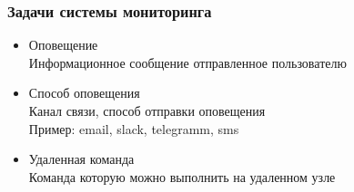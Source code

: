 \begin{frame}[fragile]
    \frametitle{Задачи системы мониторинга}
        \begin{itemize}
            \item \alert{Оповещение} \\
Информационное сообщение отправленное пользователю
            \item \alert{Способ оповещения} \\
Канал связи, способ отправки оповещения \\
Пример: email, slack, telegramm, sms
            \item \alert{Удаленная команда} \\
Команда которую можно выполнить на удаленном узле
        \end{itemize}
\end{frame}